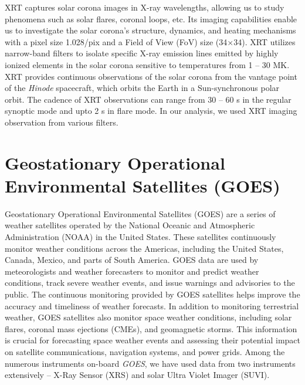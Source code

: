 XRT captures solar corona images in X-ray wavelengths, allowing us to study phenomena such as solar flares, coronal loops, etc. Its imaging capabilities enable us to investigate the solar corona's structure, dynamics, and heating mechanisms with a pixel size 1.028{\arcsec}/pix and a Field of View (FoV) size (34{\arcmin}$\times$34{\arcmin}). XRT utilizes narrow-band filters to isolate specific X-ray emission lines emitted by highly ionized elements in the solar corona sensitive to temperatures from 1 {--} 30 MK. XRT provides continuous observations of the solar corona from the vantage point of the {\it Hinode} spacecraft, which orbits the Earth in a Sun-synchronous polar orbit. The cadence of XRT observations can range from 30 {--} 60 s in the regular synoptic mode and upto 2 s in flare mode. In our analysis, we used XRT imaging observation from various filters. %

\section{Geostationary Operational Environmental Satellites (GOES)}

Geostationary Operational Environmental Satellites (GOES) are a series of weather satellites operated by the National Oceanic and Atmospheric Administration (NOAA) in the United States. These satellites continuously monitor weather conditions across the Americas, including the United States, Canada, Mexico, and parts of South America. GOES data are used by meteorologists and weather forecasters to monitor and predict weather conditions, track severe weather events, and issue warnings and advisories to the public. The continuous monitoring provided by GOES satellites helps improve the accuracy and timeliness of weather forecasts. In addition to monitoring terrestrial weather, GOES satellites also monitor space weather conditions, including solar flares, coronal mass ejections (CMEs), and geomagnetic storms. This information is crucial for forecasting space weather events and assessing their potential impact on satellite communications, navigation systems, and power grids. Among the numerous instruments on-board {\it GOES}, we have used data from two instruments extensively {--} X-Ray Sensor (XRS) and solar Ultra Violet Imager (SUVI).

